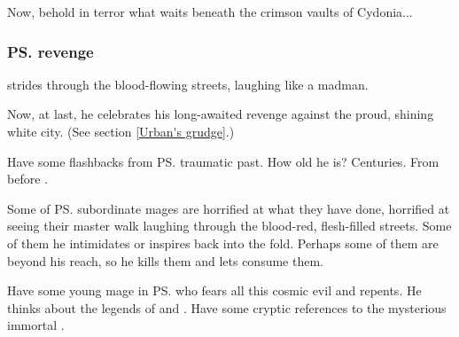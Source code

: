 \begin{garbage}
{  Now, behold in terror what waits beneath the crimson vaults of Cydonia...
}







\subsubsection{\ps{\Urban}{} revenge}
\Urban{} strides through the blood-flowing streets, laughing like a madman. 

Now, at last, he celebrates his long-awaited revenge against the proud, shining white city. (See section \ref{Urban's grudge}.)

Have some flashbacks from \ps{\Urban}{} traumatic past. How old he is? Centuries. From before \hs{\GreatBelkade}. 

Some of \ps{\Urban}{} subordinate mages are horrified at what they have done, horrified at seeing their master walk laughing through the blood-red, flesh-filled streets. Some of them he intimidates or inspires back into the fold. Perhaps some of them are beyond his reach, so he kills them and lets \Nithdornazsh{} consume them. 

Have some young mage in \ps{\Urban}{} \ishrah{} who fears all this cosmic evil and repents. He thinks about the legends of \Ishnaruchaefir{} and \Secherdamon. Have some cryptic references to the mysterious immortal \Ishna. 









\end{garbage}

